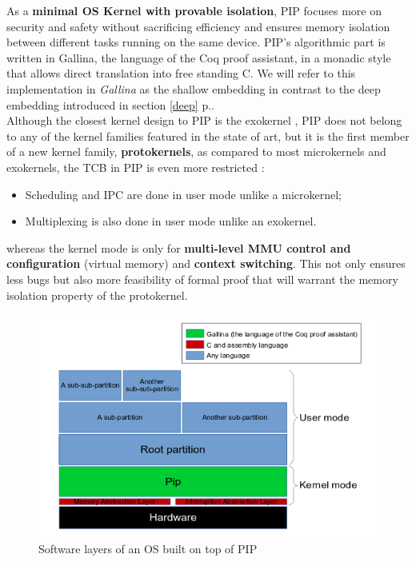 As a \textbf{minimal OS Kernel with provable isolation}, PIP \cite{PIP} focuses more on security and safety without sacrificing efficiency and ensures memory isolation between different tasks running on the same device. PIP's algorithmic part is written in Gallina, the language of the Coq proof assistant, in a monadic style that allows direct translation into free standing C. We will refer to this implementation in \textit{Gallina} as the shallow embedding in contrast to the deep embedding introduced in section \ref{deep} p.\pageref{deep}. \\
  
Although the closest kernel design to PIP is the exokernel \cite{PIPSlides}, PIP does not belong to any of the kernel families featured in the state of art, but it is the first member of a new kernel family, \textbf{protokernels}, as compared to most microkernels and exokernels, the TCB in PIP is even more restricted :
\begin{itemize}
	\item Scheduling and IPC are done in user mode unlike a microkernel;
	\item Multiplexing is also done in user mode unlike an exokernel.
\end{itemize}

\noindent whereas the kernel mode is only for \textbf{multi-level MMU control and configuration} (virtual memory) and \textbf{context switching}. This not only ensures less bugs but also more feasibility of formal proof that will warrant the memory isolation property of the protokernel.

\begin{figure}[!ht]
	\centering 
	\includegraphics[width=0.9\linewidth ,frame]{img/OSLayersPIP.png} 
	\caption[Software layers of an OS built on top of PIP]{Software layers of an OS built on top of PIP \cite{PIPSlides}}
\end{figure}

